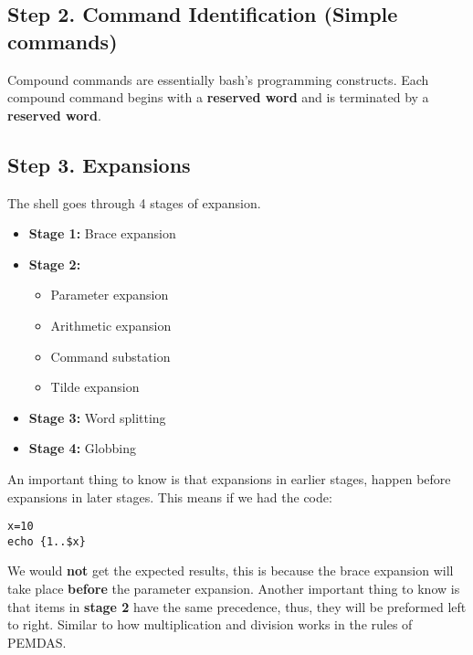 \documentclass{report}
\begin{document}
   \bigbreak \noindent 
  \subsection{Step 2. Command Identification (Simple commands)}
  \bigbreak \noindent 
  \begin{concept}
		 Compound commands are essentially bash's programming constructs. Each compound command begins with a \textbf{reserved word} and is terminated by a \textbf{reserved word}.
	\end{concept}

  \bigbreak \noindent 
  \subsection{Step 3. Expansions}
  \bigbreak \noindent 
  The shell goes through 4 stages of expansion.
  \begin{itemize}
      \item \textbf{Stage 1:} Brace expansion
        \item \textbf{Stage 2:}
            \begin{itemize}
                \item Parameter expansion
                \item Arithmetic expansion
                \item Command substation
                \item Tilde expansion
            \end{itemize}
        \item \textbf{Stage 3:} Word splitting
        \item \textbf{Stage 4:} Globbing
  \end{itemize}
  \bigbreak \noindent 
  An important thing to know is that expansions in earlier stages, happen before expansions in later stages. This means if we had the code:
  \begin{mdframed}[style=purplebox]
  \begin{verbatim}
x=10
echo {1..$x}
  \end{verbatim}
  \bigbreak \noindent
  \end{mdframed}
  \bigbreak \noindent 
  We would \textbf{not} get the expected results, this is because the brace expansion will take place \textbf{before} the parameter expansion.
  \bigbreak \noindent 
  Another important thing to know is that items in \textbf{stage 2} have the same precedence, thus, they will be preformed left to right. Similar to how multiplication and division works in the rules of PEMDAS.
\end{document}
